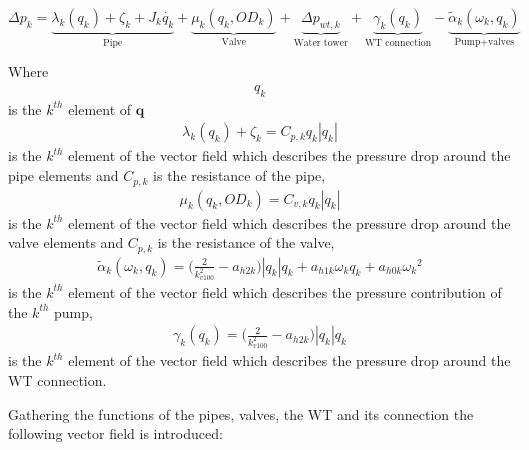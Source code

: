 
\begin{equation}
\label{CompleteModel_extended}
\Delta p_k \!= \! \underbrace{\lambda_k (q_k) \!+ \! \zeta_k \!+ \! J_k \dot{q_k}}_\text{Pipe} \!+ \!\underbrace{\mu_k (q_k,OD_k)}_\text{Valve}\! + \!\underbrace{\Delta p_{wt,k}}_\text{Water tower} \!+\! \underbrace{\gamma_k (q_k)}_\text{WT connection}\! -\! \underbrace{\tilde{\alpha}_k(\omega_k,q_k)}_\text{Pump+valves}
\end{equation}

Where
\begin{align*}
q_k 
\end{align*}
is the $k^{th}$ element of $\bm{q}$
%
\begin{align*}
\lambda_k (q_k) + \zeta_k= C_{p,k} q_k |q_k|
\end{align*}
is the $k^{th}$ element of the vector field which describes the pressure drop around the pipe elements and $C_{p,k}$ is the resistance of the pipe,
%
\begin{align*}
\mu_k (q_k,OD_k) = C_{v,k} q_k |q_k| 
\end{align*}
is the $k^{th}$ element of the vector field which describes the pressure drop around the valve elements and $C_{p,k}$ is the resistance of the valve,
%
\begin{align*}
\tilde{\alpha}_k(\omega_k,q_k) = \Big(\frac{2}{k_{v100}^2} - a_{h2k}\Big)|q_k| q_k + a_{h1k} \omega_{k} q_k + a_{h0k}{\omega_k}^2
\end{align*}
is the $k^{th}$ element of the vector field which describes the pressure contribution of the $k^{th}$ pump,
%
\begin{align*}
\gamma_k (q_k) = \Big(\frac{2}{k_{v100}^2} - a_{h2k}\Big)|q_k| q_k  
\end{align*}
is the $k^{th}$ element of the vector field which describes the pressure drop around the WT connection.

Gathering the functions of the pipes, valves, the WT and its connection the following vector field is introduced:

